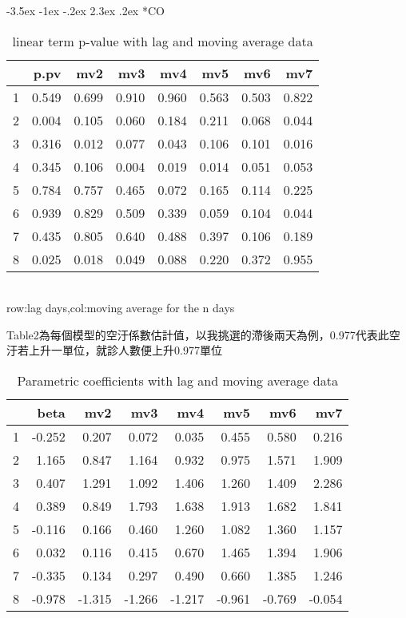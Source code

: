 \documentclass[a4paper, 12pt]{article}
\makeatletter
\def\large{\fontsize{14}{20}\selectfont}
\renewcommand\subsection{\@startsection {subsection}{1}{\z@}%
                                   {-3.5ex \@plus -1ex \@minus -.2ex}%
                                   {2.3ex \@plus.2ex}%
                                   {\centering\normalfont\large\bfseries}}
\makeatother
\begin{document}
\subsection*{CO}
\begin{table}[h]
\centering
\caption{linear term p-value with lag and moving average data}
\begin{tabular}{rrrrrrrr}
  \hline
 & p.pv & mv2 & mv3 & mv4 & mv5 & mv6 & mv7 \\
  \hline
1 & 0.549 & 0.699 & 0.910 & 0.960 & 0.563 & 0.503 & 0.822 \\
  2 & 0.004 & 0.105 & 0.060 & 0.184 & 0.211 & 0.068 & 0.044 \\
  3 & 0.316 & 0.012 & 0.077 & 0.043 & 0.106 & 0.101 & 0.016 \\
  4 & 0.345 & 0.106 & 0.004 & 0.019 & 0.014 & 0.051 & 0.053 \\
  5 & 0.784 & 0.757 & 0.465 & 0.072 & 0.165 & 0.114 & 0.225 \\
  6 & 0.939 & 0.829 & 0.509 & 0.339 & 0.059 & 0.104 & 0.044 \\
  7 & 0.435 & 0.805 & 0.640 & 0.488 & 0.397 & 0.106 & 0.189 \\
  8 & 0.025 & 0.018 & 0.049 & 0.088 & 0.220 & 0.372 & 0.955 \\
   \hline
\end{tabular}
\\row:lag days,col:moving average for the n days
\end{table}
\begin{table}[h]
Table2為每個模型的空汙係數估計值，以我挑選的滯後兩天為例，0.977代表此空汙若上升一單位，就診人數便上升0.977單位\\
\centering
\caption{Parametric coefficients with lag and moving average data}
\begin{tabular}{rrrrrrrr}
  \hline
 & beta & mv2 & mv3 & mv4 & mv5 & mv6 & mv7 \\
  \hline
1 & -0.252 & 0.207 & 0.072 & 0.035 & 0.455 & 0.580 & 0.216 \\
  2 & 1.165 & 0.847 & 1.164 & 0.932 & 0.975 & 1.571 & 1.909 \\
  3 & 0.407 & 1.291 & 1.092 & 1.406 & 1.260 & 1.409 & 2.286 \\
  4 & 0.389 & 0.849 & 1.793 & 1.638 & 1.913 & 1.682 & 1.841 \\
  5 & -0.116 & 0.166 & 0.460 & 1.260 & 1.082 & 1.360 & 1.157 \\
  6 & 0.032 & 0.116 & 0.415 & 0.670 & 1.465 & 1.394 & 1.906 \\
  7 & -0.335 & 0.134 & 0.297 & 0.490 & 0.660 & 1.385 & 1.246 \\
  8 & -0.978 & -1.315 & -1.266 & -1.217 & -0.961 & -0.769 & -0.054 \\
   \hline
\end{tabular}
\end{table}
\clearpage
\end{document}
